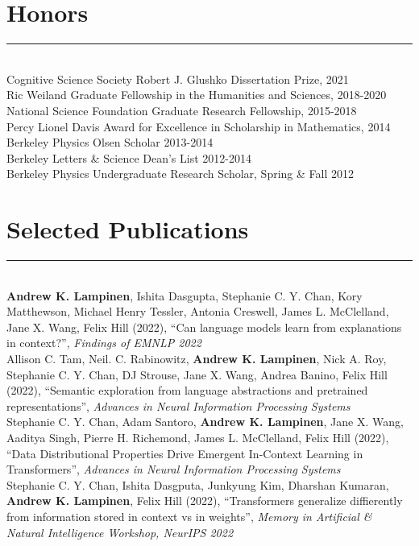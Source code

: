 \documentclass[margin]{res}
\begin{document}
\begin{resume}
\section{Honors} \vspace{-15pt} \rule{\textwidth}{0.5pt} \\[3pt]
Cognitive Science Society Robert J. Glushko Dissertation Prize, 2021 \\
Ric Weiland Graduate Fellowship in the Humanities and Sciences, 2018-2020 \\
National Science Foundation Graduate Research Fellowship, 2015-2018 \\
Percy Lionel Davis Award for Excellence in Scholarship in Mathematics, 2014 \\ 
Berkeley Physics Olsen Scholar 2013-2014 \\
Berkeley Letters \& Science Dean's List 2012-2014\\
Berkeley Physics Undergraduate Research Scholar, Spring \& Fall 2012
\vspace{1pt}\section{Selected Publications} \vspace{-15pt} \rule{\textwidth}{0.5pt} \\[3pt]
\textbf{Andrew K. Lampinen}, Ishita Dasgupta, Stephanie C. Y. Chan, Kory Matthewson, Michael Henry Tessler, Antonia Creswell, James L. McClelland, Jane X. Wang, Felix Hill (2022), {``Can language models learn from explanations in context?'',} \textit{Findings of EMNLP 2022} \\[3pt] 
Allison C. Tam,  Neil. C. Rabinowitz, \textbf{Andrew K. Lampinen}, Nick A. Roy, Stephanie C. Y. Chan, DJ Strouse, Jane X. Wang, Andrea Banino, Felix Hill (2022), {``Semantic exploration from language abstractions and pretrained representations'',} \textit{Advances in Neural Information Processing Systems} \\[3pt] 
Stephanie C. Y. Chan, Adam Santoro, \textbf{Andrew K. Lampinen}, Jane X. Wang, Aaditya Singh, Pierre H. Richemond, James L. McClelland, Felix Hill (2022), {``Data Distributional Properties Drive Emergent In-Context Learning in Transformers'',} \textit{Advances in Neural Information Processing Systems} \\[3pt] 
Stephanie C. Y. Chan, Ishita Dasgputa, Junkyung Kim, Dharshan Kumaran, \textbf{Andrew K. Lampinen}, Felix Hill (2022), {``Transformers generalize diffierently from information stored in context vs in weights'',} \textit{Memory in Artificial \& Natural Intelligence Workshop, NeurIPS 2022} \\[3pt]

\end{resume}
\end{document}
